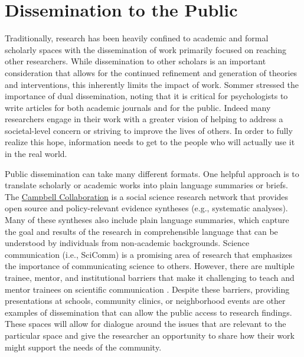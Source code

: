 \documentclass[
  11pt,
]{book}
\begin{document}
\section{Dissemination to the Public}\label{dissemination-to-the-public}

Traditionally, research has been heavily confined to academic and formal scholarly spaces with the dissemination of work primarily focused on reaching other researchers. While dissemination to other scholars is an important consideration that allows for the continued refinement and generation of theories and interventions, this inherently limits the impact of work. Sommer \citeyearpar{sommer_dual_2006} stressed the importance of dual dissemination, noting that it is critical for psychologists to write articles for both academic journals and for the public. Indeed many researchers engage in their work with a greater vision of helping to address a societal-level concern or striving to improve the lives of others. In order to fully realize this hope, information needs to get to the people who will actually use it in the real world.

Public dissemination can take many different formats. One helpful approach is to translate scholarly or academic works into plain language summaries or briefs. The \href{https://www.campbellcollaboration.org}{Campbell Collaboration} is a social science research network that provides open source and policy-relevant evidence syntheses (e.g., systematic analyses). Many of these syntheses also include plain language summaries, which capture the goal and results of the research in comprehensible language that can be understood by individuals from non-academic backgrounds. Science communication (i.e., SciComm) is a promising area of research that emphasizes the importance of communicating science to others. However, there are multiple trainee, mentor, and institutional barriers that make it challenging to teach and mentor trainees on scientific communication \citep{anderson_mentoring_2022}. Despite these barriers, providing presentations at schools, community clinics, or neighborhood events are other examples of dissemination that can allow the public access to research findings. These spaces will allow for dialogue around the issues that are relevant to the particular space and give the researcher an opportunity to share how their work might support the needs of the community.
\end{document}
